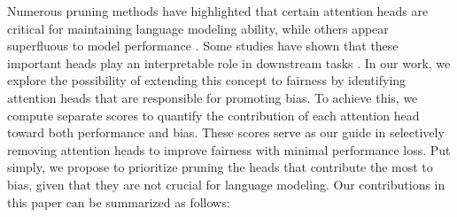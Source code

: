 \documentclass[letterpaper]{article} %
\begin{document}
Numerous pruning methods have highlighted that certain attention heads are critical for maintaining language modeling ability, while others appear superfluous to model performance \cite{voita-etal-2019-analyzing,NEURIPS2019_2c601ad9,he-choi-2021-stem,bian-etal-2021-attention,zhang-etal-2021-enlivening}. Some studies have shown that these important heads play an interpretable role in downstream tasks \cite{wang2022interpretability,voita-etal-2019-analyzing,he-choi-2021-stem}. %
In our work, we explore the possibility of extending this concept to fairness by identifying attention heads that are responsible for promoting bias. To achieve this, we compute separate scores to quantify the contribution of each attention head toward both
performance and bias. These scores serve as our guide in selectively removing attention heads to improve fairness with minimal performance loss. Put simply, we propose to prioritize pruning the heads that contribute the most to bias, %
given that they are not crucial for language modeling. %
Our contributions in this paper can be summarized as follows:
\end{document}
